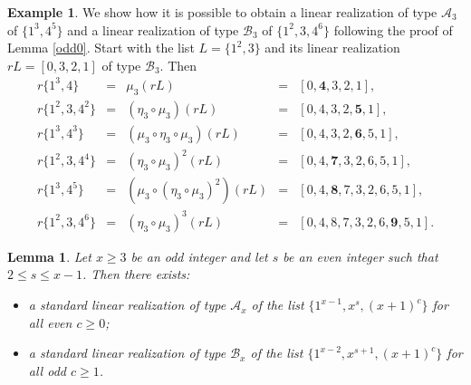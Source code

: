 \documentclass{amsart}
\newtheorem{lem}[prop]{Lemma}
\theoremstyle{definition}
\newtheorem{ex}[prop]{Example}
\numberwithin{equation}{section}
\def\A{\mathcal{A}}
\def\B{\mathcal{B}}
\begin{document}
\begin{ex}
We show how it is possible to obtain a  linear realization of type $\A_3$ of $\{1^3,4^5\}$ and
a linear realization of type $\B_3$ of $\{1^2,3,4^6\}$ following the proof of Lemma \ref{odd0}.
Start with the list $L=\{1^2,3\}$ and its linear realization $rL=[0,3,2,1]$ of type $\B_3$. Then
$$\begin{array}{rcccl}
r\{1^3,4\} & = & \mu_3(rL) & =& [0,\bm{4},3,2,1], \\
r\{1^2,3,4^2\} & = & (\eta_3\circ\mu_3)(rL) & =& [0,4,3,2,\bm{5},1], \\
r\{1^3,4^3\} & = & (\mu_3\circ\eta_3\circ\mu_3)(rL) & =& [0,4,3,2,\bm{6}, 5,1], \\
r\{1^2,3,4^4\} & = & (\eta_3\circ\mu_3)^2(rL) & =& [0,4,\bm{7},3,2,6,5,1], \\
r\{1^3,4^5\} & = & (\mu_3\circ(\eta_3\circ\mu_3)^2)(rL) & =& [0, 4,\bm{8},7,3,2,6,5,1], \\
r\{1^2,3,4^6\} & = & (\eta_3\circ\mu_3)^3(rL) & =& [0,4,8,7,3,2,6,\bm{9},5,1].
\end{array}$$
\end{ex}


\begin{lem}\label{odd1}
Let $x\geq 3$ be an odd integer and let $s$ be an even integer such that $2\leq  s\leq x-1$. Then there exists:
\begin{itemize}
\item[(1)] a standard linear realization of type $\A_x$ of the list $\{1^{x-1}, x^s, (x+1)^c\}$ for all even $c\geq 0$;
\item[(2)] a standard linear realization of type $\B_x$ of the list $\{1^{x-2}, x^{s+1}, (x+1)^c\}$ for all odd $c\geq 1$.
\end{itemize}
\end{lem}
\end{document}
